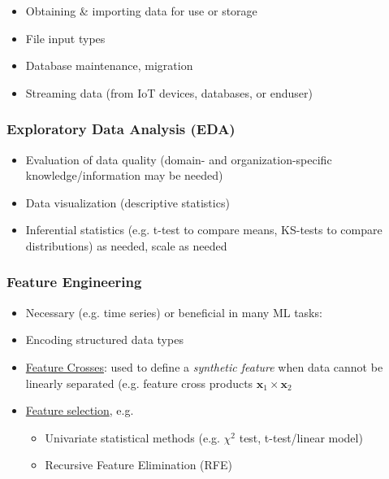\documentclass[10pt,landscape,letterpaper]{cheatsheet}
\begin{document}
\begin{multicols}{3}
\begin{itemize}
    \item Obtaining \& importing data for use or storage
    \item File input types
    \item Database maintenance, migration
    \item Streaming data (from IoT devices, databases, or enduser)
\end{itemize}

\subsubsection{Exploratory Data Analysis (EDA)} 

\begin{itemize}
    \item Evaluation of data quality (domain- and organization-specific knowledge/information may be needed)
    \item Data visualization (descriptive statistics)
    \item Inferential statistics (e.g. t-test to compare means, KS-tests to compare distributions) as needed, scale as needed
\end{itemize}

\subsubsection{Feature Engineering}

\begin{itemize}
    \item Necessary (e.g. time series) or beneficial in many ML tasks:
    \item Encoding structured data types
    \item \href{https://developers.google.com/machine-learning/crash-course/feature-crosses/video-lecture}{Feature Crosses}: used to define a \emph{synthetic feature} when data cannot be linearly separated (e.g. feature cross products $\mathbf{x}_1 \times \mathbf{x}_2$
    \item \href{https://scikit-learn.org/stable/modules/feature_selection.html}{Feature selection}, e.g.
    \begin{itemize}
        \item Univariate statistical methods (e.g. $\chi^2$ test, t-test/linear model)
        \item Recursive Feature Elimination (RFE)
    \end{itemize}
\end{itemize}


\end{multicols}
\end{document}
